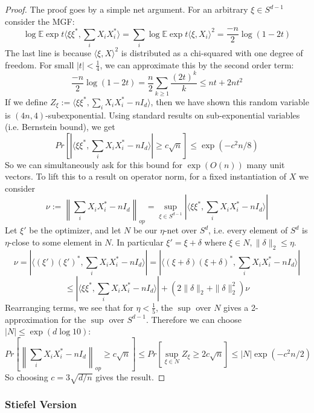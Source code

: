 \documentclass[aos]{imsart}
\theoremstyle{definition}
\newcommand{\E}{\mathbb{E}}
\begin{document}
\begin{proof}
The proof goes by a simple net argument. For an arbitrary $\xi \in S^{d-1}$ consider the MGF:
\[ \log \E \exp t \langle \xi \xi^{*}, \sum_{i} X_{i} X_{i}^{*} \rangle = \sum_{i} \log \E \exp t \langle \xi, X_{i} \rangle^{2} = \frac{-n}{2} \log (1 - 2t)     \]
The last line is because $\langle \xi, X \rangle^{2}$ is distributed as a chi-squared with one degree of freedom. For small $|t| < \frac{1}{4}$, we can approximate this by the second order term:
\[ \frac{-n}{2} \log (1 - 2t) = \frac{n}{2} \sum_{k \geq 1} \frac{(2t)^{k}}{k} \leq n t + 2 n t^{2}    \]
If we define $Z_{\xi} := \langle \xi \xi^{*}, \sum_{i} X_{i} X_{i}^{*} - n I_{d} \rangle$, then we have shown this random variable is $(4n, 4)$-subexponential. Using standard results on sub-exponential variables (i.e. Bernstein bound), we get
\[ Pr \left[ |\langle \xi \xi^{*}, \sum_{i} X_{i} X_{i}^{*}  - n I_{d} \rangle | \geq c \sqrt{n}  \right] \leq \exp( - c^{2} n / 8)     \]
So we can simultaneously ask for this bound for $\exp(O(n))$ many unit vectors. To lift this to a result on operator norm, for a fixed instantiation of $X$ we consider
\[ \nu := \left\| \sum_{i} X_{i} X_{i}^{*} - n I_{d} \right\|_{op} = \sup_{\xi \in S^{d-1}} |\langle \xi \xi^{*}, \sum_{i} X_{i} X_{i}^{*} - n I_{d} \rangle|    \]
Let $\xi'$ be the optimizer, and let $N$ be our $\eta$-net over $S^{d}$, i.e. every element of $S^{d}$ is $\eta$-close to some element in $N$. In particular $\xi' = \xi + \delta$ where $\xi \in N, \|\delta\|_{2} \leq \eta$.
\[ \nu = |\langle (\xi') (\xi')^{*}, \sum_{i} X_{i} X_{i}^{*} - n I_{d} \rangle| = |\langle (\xi + \delta) (\xi + \delta)^{*}, \sum_{i} X_{i} X_{i}^{*} - n I_{d} \rangle|      \]
\[ \leq |\langle \xi \xi^{*}, \sum_{i} X_{i} X_{i}^{*} - n I_{d} \rangle| + (2 \|\delta\|_{2} + \|\delta\|_{2}^{2}) \nu    \]
Rearranging terms, we see that for $\eta < \frac{1}{5}$, the $\sup$ over $N$ gives a 2-approximation for the $\sup$ over $S^{d-1}$. Therefore we can choose $|N| \leq \exp( d \log 10)$:
\[ Pr \left[ \left\| \sum_{i} X_{i} X_{i}^{*} - n I_{d} \right\|_{op} \geq c \sqrt{n}  \right] \leq Pr \left[ \sup_{\xi \in N} Z_{\xi} \geq 2 c \sqrt{n}  \right] \leq |N| \exp( - c^{2} n / 2)    \]
So choosing $c = 3 \sqrt{d/n}$ gives the result.
\end{proof}

\subsubsection{Stiefel Version}
\end{document}

